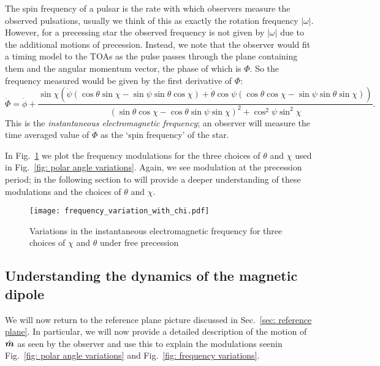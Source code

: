 \documentclass[../full_thesis/full_thesis.tex]{subfiles}
\begin{document}
The spin frequency of a pulsar is the rate with which observers measure the
observed pulsations, usually we think of this as exactly the rotation frequency
$|\omega|$. However, for a precessing star the observed frequency is not given by
$|\omega|$ due to the additional motions of precession. Instead, we note that the
observer would fit a timing model to the TOAs as the pulse passes through the
plane containing them and the angular momentum vector, the phase of which is
$\Phi$. So the frequency measured would be given by the first derivative of $\Phi$:
\begin{equation}
\dot{\Phi} = \dot{\phi}
+ \frac{\sin\chi \left(
\dot{\psi} (\cos\theta\sin\chi - \sin \psi \sin \theta \cos\chi) +
\dot{\theta} \cos\psi (\cos\theta\cos\chi - \sin \psi \sin \theta \sin\chi)\right)
}{(\sin\theta \cos \chi - \cos \theta \sin \psi \sin \chi)^{2} + \cos^{2}\psi \sin^{2} \chi}.
\label{eqn: Phi_dot}
\end{equation}
This is the \emph{instantaneous electromagnetic frequency}; an observer
will measure the time averaged value of $\dot{\Phi}$ as the `spin frequency' of
the star.

In Fig.~\ref{fig: frequency variations} we plot the frequency modulations for
the three choices of $\theta$ and $\chi$ used in Fig.~\ref{fig: polar angle variations}.
Again, we see modulation at the precession period; in the following section to
will provide a deeper understanding of these modulations and the choices of
$\theta$ and $\chi$.
\begin{figure}[htb]
\centering
  \texttt{[image: frequency\_variation\_with\_chi.pdf]}
\caption{Variations in the instantaneous electromagnetic frequency for three choices
of $\chi$ and $\theta$ under free precession}
\label{fig: frequency variations}
\end{figure}


\subsection{Understanding the dynamics of the magnetic dipole}
\label{sec: understanding the motion of m}

We will now return to the reference plane picture discussed in Sec.~\ref{sec:
reference plane}. In particular, we will now provide a detailed description of
the motion of $\hat{\boldsymbol{m}}$ as seen by the observer and use this to explain the
modulations seenin Fig.~\ref{fig: polar angle variations} and Fig.~\ref{fig:
frequency variations}.
\end{document}
